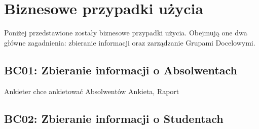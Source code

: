%


\pagebreak
\section{Biznesowe przypadki użycia}
\label{Chapter23}

Poniżej przedstawione zostały biznesowe przypadki użycia. Obejmują one dwa główne zagadnienia: zbieranie informacji oraz zarządzanie Grupami Docelowymi.

\subsection{BC01: Zbieranie informacji o Absolwentach}
\label{Chapter231}

{Ankieter chce ankietować Absolwentów}
{Ankieta, Raport}{}
{}

\subsection{BC02: Zbieranie informacji o Studentach}
\label{Chapter232}

